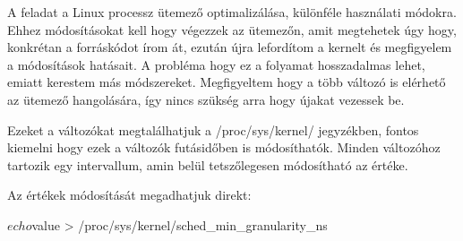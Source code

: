 A feladat a Linux processz ütemező optimalizálása, különféle használati módokra.
Ehhez módosításokat kell hogy végezzek az ütemezőn, amit megtehetek úgy hogy, konkrétan a forráskódot írom át, ezután újra lefordítom a kernelt és megfigyelem a módosítások hatásait.
A probléma hogy ez a folyamat hosszadalmas lehet, emiatt kerestem más módszereket.
Megfigyeltem hogy a több változó is elérhető az ütemező hangolására, így nincs szükség arra hogy újakat vezessek be.

Ezeket a változókat megtalálhatjuk a /proc/sys/kernel/ jegyzékben, fontos kiemelni hogy ezek a változók futásidőben is módosíthatók. Minden változóhoz tartozik egy intervallum, amin belül tetszőlegesen módosítható az értéke. 

Az értékek módosítását megadhatjuk direkt:
\begin{python}
$ echo $value > /proc/sys/kernel/sched_min_granularity_ns
\end{python}%

